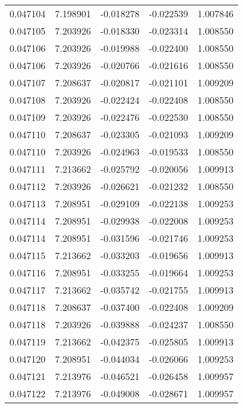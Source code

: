 \begin{tabular}{lrrrr}
0.047104    &  7.198901 & -0.018278 & -0.022539 &             1.007846 \\
0.047105    &  7.203926 & -0.018330 & -0.023314 &             1.008550 \\
0.047106    &  7.203926 & -0.019988 & -0.022400 &             1.008550 \\
0.047106    &  7.203926 & -0.020766 & -0.021616 &             1.008550 \\
0.047107    &  7.208637 & -0.020817 & -0.021101 &             1.009209 \\
0.047108    &  7.203926 & -0.022424 & -0.022408 &             1.008550 \\
0.047109    &  7.203926 & -0.022476 & -0.022530 &             1.008550 \\
0.047110    &  7.208637 & -0.023305 & -0.021093 &             1.009209 \\
0.047110    &  7.203926 & -0.024963 & -0.019533 &             1.008550 \\
0.047111    &  7.213662 & -0.025792 & -0.020056 &             1.009913 \\
0.047112    &  7.203926 & -0.026621 & -0.021232 &             1.008550 \\
0.047113    &  7.208951 & -0.029109 & -0.022138 &             1.009253 \\
0.047114    &  7.208951 & -0.029938 & -0.022008 &             1.009253 \\
0.047114    &  7.208951 & -0.031596 & -0.021746 &             1.009253 \\
0.047115    &  7.213662 & -0.033203 & -0.019656 &             1.009913 \\
0.047116    &  7.208951 & -0.033255 & -0.019664 &             1.009253 \\
0.047117    &  7.213662 & -0.035742 & -0.021755 &             1.009913 \\
0.047118    &  7.208637 & -0.037400 & -0.022408 &             1.009209 \\
0.047118    &  7.203926 & -0.039888 & -0.024237 &             1.008550 \\
0.047119    &  7.213662 & -0.042375 & -0.025805 &             1.009913 \\
0.047120    &  7.208951 & -0.044034 & -0.026066 &             1.009253 \\
0.047121    &  7.213976 & -0.046521 & -0.026458 &             1.009957 \\
0.047122    &  7.213976 & -0.049008 & -0.028671 &             1.009957 \\

\end{tabular}
